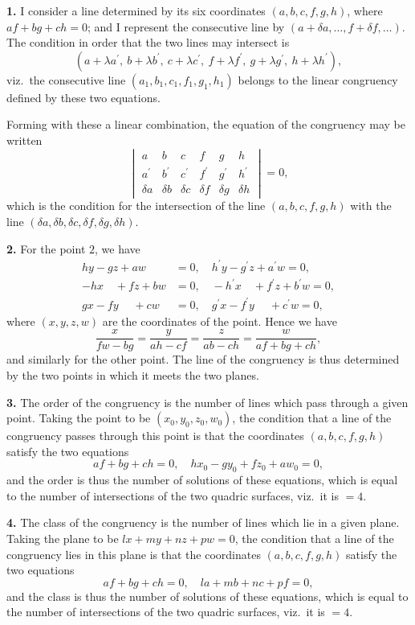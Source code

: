 \documentclass[12pt,a4paper]{article}
\begin{document}
\textbf{1.} I consider a line determined by its six coordinates $(a, b, c, f, g, h)$, where
$af + bg + ch = 0$; and I represent the consecutive line by $(a + \delta a, \ldots, f + \delta f, \ldots)$.
The condition in order that the two lines may intersect is
\[
(a + \lambda a^\prime,\ b + \lambda b^\prime,\ c + \lambda c^\prime,\ f + \lambda f^\prime,\ g + \lambda g^\prime,\ h + \lambda h^\prime),
\]
viz.~the consecutive line $(a_1, b_1, c_1, f_1, g_1, h_1)$ belongs to the linear congruency defined
by these two equations.

Forming with these a linear combination, the equation of the congruency may
be written
\[
\begin{vmatrix}
a & b & c & f & g & h \\
a^\prime & b^\prime & c^\prime & f^\prime & g^\prime & h^\prime \\
\delta a & \delta b & \delta c & \delta f & \delta g & \delta h
\end{vmatrix} = 0,
\]
which is the condition for the intersection of the line $(a, b, c, f, g, h)$ with the line
$(\delta a, \delta b, \delta c, \delta f, \delta g, \delta h)$.

\textbf{2.} For the point $2$, we have
\begin{align*}
hy - gz + aw &= 0, \quad h^\prime y - g^\prime z + a^\prime w = 0,\\
-hx\quad + fz + bw &= 0, \quad -h^\prime x\quad + f^\prime z + b^\prime w = 0,\\
gx - fy\quad\; + cw &= 0, \quad g^\prime x - f^\prime y\quad\; + c^\prime w = 0,
\end{align*}
where $(x, y, z, w)$ are the coordinates of the point. Hence we have
\[
\frac{x}{fw - bg} = \frac{y}{ah - cf} = \frac{z}{ab - ch} = \frac{w}{af + bg + ch},
\]
and similarly for the other point. The line of the congruency is thus determined
by the two points in which it meets the two planes.

\textbf{3.} The order of the congruency is the number of lines which pass through
a given point. Taking the point to be $(x_0, y_0, z_0, w_0)$, the condition that a line of the
congruency passes through this point is that the coordinates $(a, b, c, f, g, h)$ satisfy
the two equations
\[
af + bg + ch = 0, \quad hx_0 - gy_0 + fz_0 + aw_0 = 0,
\]
and the order is thus the number of solutions of these equations, which is equal
to the number of intersections of the two quadric surfaces, viz.~it is $= 4$.

\textbf{4.} The class of the congruency is the number of lines which lie in a given
plane. Taking the plane to be $lx + my + nz + pw = 0$, the condition that a line
of the congruency lies in this plane is that the coordinates $(a, b, c, f, g, h)$ satisfy
the two equations
\[
af + bg + ch = 0, \quad la + mb + nc + pf = 0,
\]
and the class is thus the number of solutions of these equations, which is equal
to the number of intersections of the two quadric surfaces, viz.~it is $= 4$.
\end{document}
